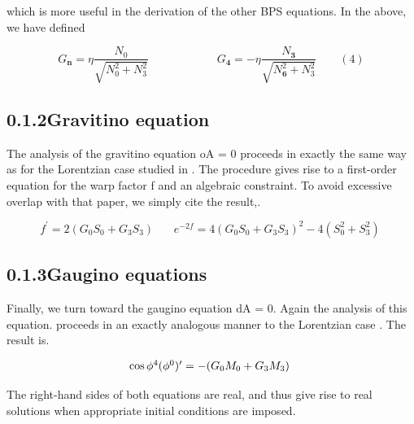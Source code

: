 \documentclass{article}
\begin{document}
which is more useful in the derivation of the other BPS equations. In the above, we have
defined


\begin{equation}
G _ { \mathbf { n } } = \eta \frac { N _ { 0 } } { \sqrt { N _ { 0 } ^ { 2 } + N _ { 3 } ^ { 2 } } } \qquad \qquad \qquad G _ { \mathbf { 4 } } = - \eta \frac { N _ { \mathbf { 3 } } } { \sqrt { N _ { \mathbf { 6 } } ^ { 2 } + N _ { 3 } ^ { 2 } } } \qquad ( 4 )
\end{equation}


\subsection*{0.1.2Gravitino equation}


The analysis of the gravitino equation oA = 0 proceeds in exactly the same way as for the
Lorentzian case studied in . The procedure gives rise to a first-order equation for the warp
factor f and an algebraic constraint. To avoid excessive overlap with that paper, we simply
cite the result,.


\begin{equation}
f ^ { \prime } = 2 ( G _ { 0 } S _ { 0 } + G _ { 3 } S _ { 3 } ) ~ ~ ~ ~ ~ ~ ~ ~ e ^ { - 2 f } = 4 ( G _ { 0 } S _ { 0 } + G _ { 3 } S _ { 3 } ) ^ { 2 } - 4 ( S _ { 0 } ^ { 2 } + S _ { 3 } ^ { 2 } ) ~
\end{equation}


\subsection*{0.1.3Gaugino equations}


Finally, we turn toward the gaugino equation dA = 0. Again the analysis of this equation.
proceeds in an exactly analogous manner to the Lorentzian case . The result is.


\begin{equation}
\begin{array} { c c } { \cos \phi ^ { 4 } ( \phi ^ { 0 } ) ^ { \prime } = - ( G _ { 0 } M _ { 0 } + G _ { 3 } M _ { 3 } ) ~ }\end{array}
\end{equation}


The right-hand sides of both equations are real, and thus give rise to real solutions when
appropriate initial conditions are imposed.
\end{document}
